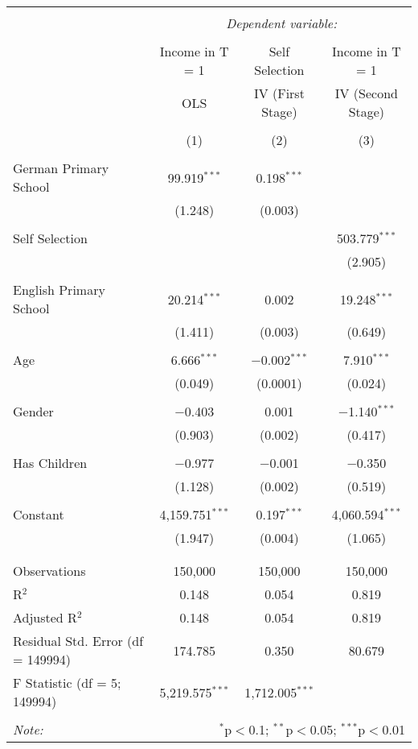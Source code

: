 
\begin{table}[!htbp] \centering 
  \caption{} 
  \label{} 
\begin{tabular}{@{\extracolsep{5pt}}lccc} 
\\[-1.8ex]\hline 
\hline \\[-1.8ex] 
 & \multicolumn{3}{c}{\textit{Dependent variable:}} \\ 
\cline{2-4} 
\\[-1.8ex] & Income in T = 1 &  Self Selection & Income in T = 1 \\ 
 & OLS & IV (First Stage) & IV (Second Stage) \\ 
\\[-1.8ex] & (1) & (2) & (3)\\ 
\hline \\[-1.8ex] 
 German Primary School & 99.919$^{***}$ & 0.198$^{***}$ &  \\ 
  & (1.248) & (0.003) &  \\ 
  & & & \\ 
 Self Selection &  &  & 503.779$^{***}$ \\ 
  &  &  & (2.905) \\ 
  & & & \\ 
 English Primary School & 20.214$^{***}$ & 0.002 & 19.248$^{***}$ \\ 
  & (1.411) & (0.003) & (0.649) \\ 
  & & & \\ 
 Age & 6.666$^{***}$ & $-$0.002$^{***}$ & 7.910$^{***}$ \\ 
  & (0.049) & (0.0001) & (0.024) \\ 
  & & & \\ 
 Gender & $-$0.403 & 0.001 & $-$1.140$^{***}$ \\ 
  & (0.903) & (0.002) & (0.417) \\ 
  & & & \\ 
 Has Children & $-$0.977 & $-$0.001 & $-$0.350 \\ 
  & (1.128) & (0.002) & (0.519) \\ 
  & & & \\ 
 Constant & 4,159.751$^{***}$ & 0.197$^{***}$ & 4,060.594$^{***}$ \\ 
  & (1.947) & (0.004) & (1.065) \\ 
  & & & \\ 
\hline \\[-1.8ex] 
Observations & 150,000 & 150,000 & 150,000 \\ 
R$^{2}$ & 0.148 & 0.054 & 0.819 \\ 
Adjusted R$^{2}$ & 0.148 & 0.054 & 0.819 \\ 
Residual Std. Error (df = 149994) & 174.785 & 0.350 & 80.679 \\ 
F Statistic (df = 5; 149994) & 5,219.575$^{***}$ & 1,712.005$^{***}$ &  \\ 
\hline 
\hline \\[-1.8ex] 
\textit{Note:}  & \multicolumn{3}{r}{$^{*}$p$<$0.1; $^{**}$p$<$0.05; $^{***}$p$<$0.01} \\ 
\end{tabular} 
\end{table} 
